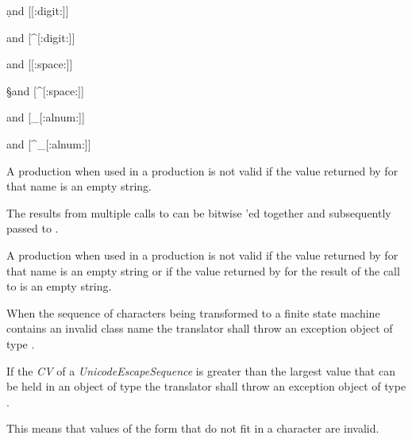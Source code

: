 \begin{outputblock}
\d and [[:digit:]]

\D and [^[:digit:]]

\s and [[:space:]]

\S and [^[:space:]]

\w and [_[:alnum:]]

\W and [^_[:alnum:]]
\end{outputblock}

\pnum
{}%
%
A  production when used in
a  production is not valid
if the value returned by  for
that name is an empty string.

\pnum
{}%
%
%
%
The results from multiple calls
to  can be bitwise 'ed
together and subsequently passed to .

\pnum
{}%
%
A  production when used in
a  production is not valid if the value
returned by  for that name is an
empty string or if the value returned by 
for the result of the call to 
is an empty string.

\pnum
{}%
When the sequence of characters being transformed to a finite state
machine contains an invalid class name the translator shall throw an
exception object of type .

\pnum
{}%
If the \textit{CV} of a \textit{UnicodeEscapeSequence} is greater than the largest
value that can be held in an object of type  the translator shall
throw an exception object of type .
\begin{note}
This means that values of the form  that do not fit in
a character are invalid.
\end{note}

